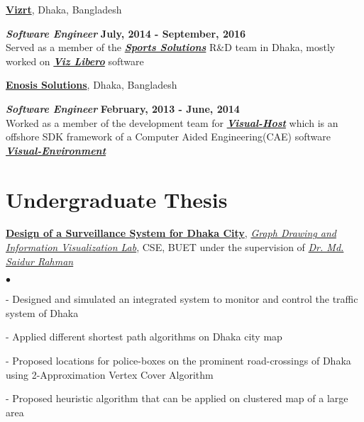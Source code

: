 \documentclass[margin,line]{res}
\newenvironment{list2}{
  \begin{list}{$\bullet$}{%
      \setlength{\itemsep}{0in}
      \setlength{\parsep}{0in} \setlength{\parskip}{0in}
      \setlength{\topsep}{0in} \setlength{\partopsep}{0in} 
      \setlength{\leftmargin}{0.2in}}}{\end{list}}
\begin{document}
\begin{resume}
\vspace{-.2cm}
{\bf \href{http://www.vizrt.com/}{Vizrt}}, Dhaka, Bangladesh

\vspace{-.4cm}
\textbf{{\em Software Engineer}} \hfill {\bf July, 2014 - September, 2016}\\
Served as a member of the \textbf{\textit{\href{http://www.vizrt.com/sports/}{Sports Solutions}}} R\&D team in Dhaka, mostly worked on \textbf{\textit{\href{http://www.vizrt.com/products/viz_libero/}{Viz Libero}}} software

\vspace{-.2cm}
{\bf \href{http://www.enosisbd.com/}{Enosis Solutions}}, Dhaka, Bangladesh

\vspace{-.4cm}
\textbf{{\em Software Engineer}} \hfill {\bf February, 2013 - June, 2014}\\
Worked as a member of the development team for \textbf{\textit{\href{http://www.enosisbd.com/downloads/dev_engineering.pdf}{Visual-Host}}} which is an offshore SDK framework of a Computer Aided Engineering(CAE) software \textbf{\textit{\href{https://www.esi-group.com/software-solutions/virtual-integration-platform/multi-domain-simulation/visual-environment}{Visual-Environment}}}

\vspace*{-.1in}

\section{\sc Undergraduate Thesis} 
\href{https://cse.buet.ac.bd/research/group/gd/index.php?pageid=SurveillanceSystemDhaka}{\bf{Design of a Surveillance System for Dhaka City}}, \textit{\href{https://cse.buet.ac.bd/research/group/gd/index.php?pageid=Home.htm}{Graph Drawing and Information Visualization Lab}}, CSE, BUET under the supervision of \textit{\href{http://teacher.buet.ac.bd/saidurrahman/}{Dr. Md. Saidur Rahman}}

\begin{list2}
\item[ - ] Designed and simulated an integrated system to monitor and control the traffic system of Dhaka
\item[ - ] Applied different shortest path algorithms on Dhaka city map
\item[ - ] Proposed locations for police-boxes on the prominent road-crossings of Dhaka using 2-Approximation Vertex Cover Algorithm
\item[ - ] Proposed heuristic algorithm that can be applied on clustered map of a large area
\end{list2}
\vspace*{-.1in}


\end{resume}
\end{document}
